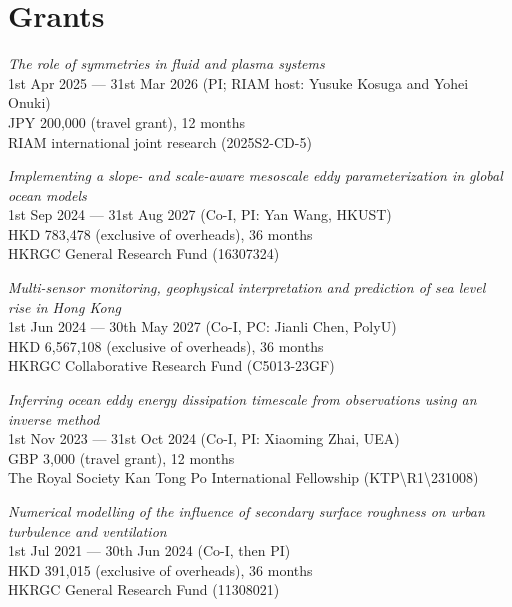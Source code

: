 \documentclass[letterpaper]{article}
\renewenvironment{itemize}{
  \begin{list}{}{
    \setlength{\leftmargin}{1.5em}
  }
}{
  \end{list}
}
\begin{document}
\section*{Grants}

\begin{itemize}

\item[--] \textit{The role of symmetries in fluid and plasma systems}\\
1st Apr 2025 --- 31st Mar 2026 (PI; RIAM host: Yusuke Kosuga and Yohei Onuki)\\
JPY 200,000 (travel grant), 12 months\\
RIAM international joint research (2025S2-CD-5)

\item[--] \textit{Implementing a slope- and scale-aware mesoscale eddy parameterization in global ocean models}\\
1st Sep 2024 --- 31st Aug 2027 (Co-I, PI: Yan Wang, HKUST)\\
HKD 783,478 (exclusive of overheads), 36 months\\
HKRGC General Research Fund (16307324)

\item[--] \textit{Multi-sensor monitoring, geophysical interpretation and prediction of sea level rise in Hong Kong}\\
1st Jun 2024 --- 30th May 2027 (Co-I, PC: Jianli Chen, PolyU)\\
HKD 6,567,108 (exclusive of overheads), 36 months\\
HKRGC Collaborative Research Fund (C5013-23GF)

\item[--] \textit{Inferring ocean eddy energy dissipation timescale from observations using an inverse method}\\
1st Nov 2023 --- 31st Oct 2024 (Co-I, PI: Xiaoming Zhai, UEA)\\
GBP 3,000 (travel grant), 12 months\\
The Royal Society Kan Tong Po International Fellowship (KTP\textbackslash R1\textbackslash 231008)

\item[--] \textit{Numerical modelling of the influence of secondary surface roughness on urban turbulence and ventilation}\\
1st Jul 2021 --- 30th Jun 2024 (Co-I, then PI)\\
HKD 391,015 (exclusive of overheads), 36 months\\
HKRGC General Research Fund (11308021)


\end{itemize}
\end{document}
